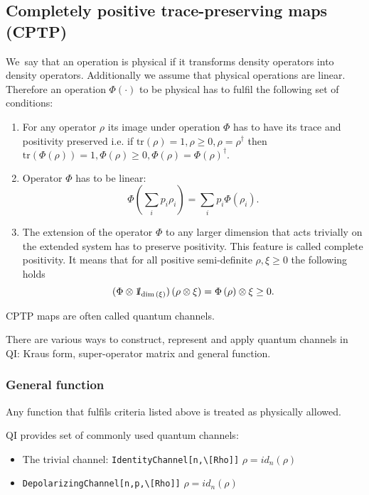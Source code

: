 \documentclass[a4paper,11pt]{elsart}
\newcommand{\1}{{\rm 1\hspace{-0.9mm}l}}
\newcommand{\tr}{\mathrm{tr}}
\newcommand{\qi}{QI}
\begin{document}
\subsection{Completely positive trace-preserving maps (CPTP)}
We~say that an operation is physical if it transforms density operators into
density operators. Additionally we assume that physical operations are linear.
Therefore an operation $\Phi(\cdot)$ to be physical has to fulfil the following
set of conditions:
\begin{enumerate}
	\item For any operator $\rho$ its image under operation $\Phi$ has to have 
its
	trace and positivity preserved i.e. if 
	$\tr{(\rho)}=1, \rho\geq0, \rho=\rho^\dagger$ then
	$\tr{(\Phi(\rho))}=1, \Phi(\rho)\geq0, \Phi(\rho)=\Phi(\rho)^\dagger.$
	\item Operator $\Phi$ has to be linear:
	\begin{equation}
		\Phi\left(\sum_i p_i\rho_i \right)=\sum_i p_i \Phi\left(\rho_i \right).
	\end{equation}
	\item The extension of the operator $\Phi$ to any larger dimension that 
acts
	trivially on the extended system has to preserve positivity. 
	This feature is called complete positivity. It means that for all positive 
semi-definite
	$\rho,\xi\geq 0$ the following holds
	\begin{equation}
		(\Phi\otimes\1_{\dim{(\xi)}})\left(\rho\otimes\xi\right)
		=\Phi\left(\rho\right)\otimes\xi \geq 0.
	\end{equation}
\end{enumerate}
CPTP maps are often called quantum channels.

There are various ways to construct, represent and apply quantum channels in 
\qi{}: Kraus form, super-operator matrix and general function.

\subsubsection{General function}
Any function that fulfils criteria listed above is treated as physically 
allowed. 

\qi{} provides set of commonly used quantum channels:
\begin{itemize}
\item The trivial channel: \lstinline!IdentityChannel[n,\[Rho]]! 
$\rho=id_n(\rho)$

\item \lstinline!DepolarizingChannel[n,p,\[Rho]]! $\rho=id_n(\rho)$
\end{itemize}
\end{document}
